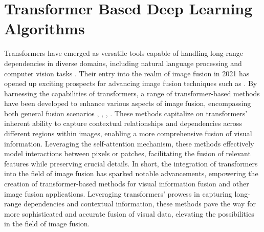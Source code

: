 \section{Transformer Based Deep Learning Algorithms}

Transformers have emerged as versatile tools capable of handling long-range dependencies in diverse domains, including natural language processing and computer vision tasks \cite{dosovitskiy2020image, liu2021swin, liu2022mfst, }. Their entry into the realm of image fusion in 2021 has opened up exciting prospects for advancing image fusion techniques such as \cite{zhao2021dndt, rao2023tgfuse, li2022cgtf, tang2022ydtr, wang2022swinfuse, yang2023dglt, tang2023tccfusion}. By harnessing the capabilities of transformers, a range of transformer-based methods have been developed to enhance various aspects of image fusion, encompassing both general fusion scenarios \cite{vs2022image}, \cite{fu2021ppt}, \cite{ma2022swinfusion}, \cite{qu2022transfuse}. These methods capitalize on transformers' inherent ability to capture contextual relationships and dependencies across different regions within images, enabling a more comprehensive fusion of visual information. Leveraging the self-attention mechanism, these methods effectively model interactions between pixels or patches, facilitating the fusion of relevant features while preserving crucial details. In short, the integration of transformers into the field of image fusion has sparked notable advancements, empowering the creation of transformer-based methods for visual information fusion and other image fusion applications. Leveraging transformers' prowess in capturing long-range dependencies and contextual information, these methods pave the way for more sophisticated and accurate fusion of visual data, elevating the possibilities in the field of image fusion.






